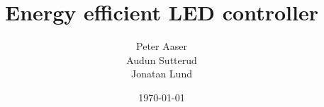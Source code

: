 \newcommand{\mytitle}{Energy efficient LED controller}
\newcommand{\myauthor}{Peter Aaser\\Audun Sutterud\\Jonatan Lund}

\title{\mytitle}
\author{\myauthor}
\date{\today}
